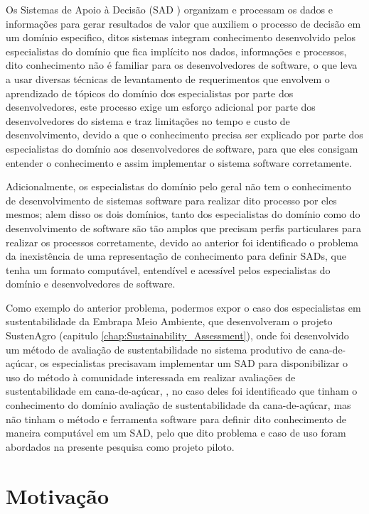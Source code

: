 Os Sistemas de Apoio à Decisão (SAD )
organizam e processam os dados e informações para gerar resultados
de valor que auxiliem o processo de decisão em um domínio especifico,
ditos sistemas integram conhecimento desenvolvido pelos especialistas
do domínio que fica implícito nos dados, informações e processos,
dito conhecimento não é familiar para os desenvolvedores de software,
o que leva a usar diversas técnicas de levantamento de requerimentos
que envolvem o aprendizado de tópicos do domínio dos especialistas
por parte dos desenvolvedores, este processo exige um esforço adicional
por parte dos desenvolvedores do sistema e traz limitações no tempo
e custo de desenvolvimento, devido a que o conhecimento precisa ser
explicado por parte dos especialistas do domínio aos desenvolvedores
de software, para que eles consigam entender o conhecimento e assim
implementar o sistema software corretamente.

Adicionalmente, os especialistas do domínio pelo geral não tem o conhecimento
de desenvolvimento de sistemas software para realizar dito processo
por eles mesmos; alem disso os dois domínios, tanto dos especialistas
do domínio como do desenvolvimento de software são tão amplos que
precisam perfis particulares para realizar os processos corretamente,
devido ao anterior foi identificado o problema da inexistência de
uma representação de conhecimento para definir SADs, que tenha um
formato computável, entendível e acessível pelos especialistas do
domínio e desenvolvedores de software.

Como exemplo do anterior problema, podermos expor o caso dos especialistas
em sustentabilidade da Embrapa Meio Ambiente, que desenvolveram o
projeto SustenAgro (capitulo \ref{chap:Sustainability_Assessment}),
onde foi desenvolvido um método de avaliação de sustentabilidade no
sistema produtivo de cana-de-açúcar, os especialistas precisavam implementar
um SAD para disponibilizar o uso do método à comunidade interessada
em realizar avaliações de sustentabilidade em cana-de-açúcar, , no
caso deles foi identificado que tinham o conhecimento do domínio avaliação
de sustentabilidade da cana-de-açúcar, mas não tinham o método e ferramenta
software para definir dito conhecimento de maneira computável em um
SAD, pelo que dito problema e caso de uso foram abordados na presente
pesquisa como projeto piloto.

\section{Motivação}

